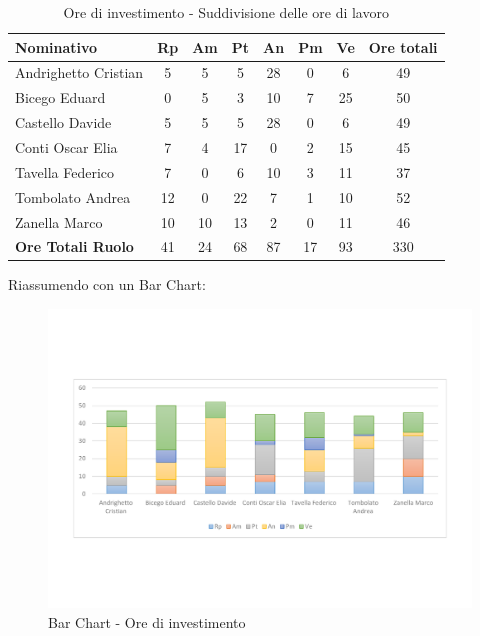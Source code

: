 \documentclass[../PianoProgetto.tex]{subfiles}
\begin{document}
	\begin{table}[h]
		\begin{tabularx}{\textwidth}{l  * {6}{C}  c}
			\toprule
			\textbf{Nominativo} & \textbf{Rp} & \textbf{Am} & \textbf{Pt} 
						& \textbf{An} & \textbf{Pm} & \textbf{Ve} & \textbf{Ore totali} \\
			\midrule
			Andrighetto Cristian & 5 & 5 & 5 & 28 &	0 &	6 &	49 \\
			Bicego Eduard & 0 & 5 & 3 & 10 & 7 & 25 & 50 \\
			Castello Davide & 5 & 5 & 5 & 28 & 0 & 6 & 49 \\
			Conti Oscar Elia & 7 & 4 & 17 & 0 & 2 & 15 & 45 \\
			Tavella Federico &	7 & 0 & 6 & 10 & 3 & 11 & 37 \\
			Tombolato Andrea & 12 & 0 & 22 & 7 & 1 & 10 & 52 \\
			Zanella Marco & 10 & 10 & 13 & 2 & 0 & 11 & 46 \\
			\midrule			
			\textbf{Ore Totali Ruolo} & 41 & 24 & 68 & 87 & 17 & 93 & 330 \\
			\bottomrule
		\end{tabularx}
		\caption{Ore di investimento - Suddivisione delle ore di lavoro}
		\label{tab:investimento_ore}
	\end{table}
\vfill	
	Riassumendo con un Bar Chart:
	
	\begin{figure}[!h]
		\centering
		\includegraphics[width=\textwidth , trim=2cm 5cm 2cm 5cm]{grafici/Riepilogo/Investimento/ore-persona}
			\caption{Bar Chart - Ore di investimento}
		\label{fig:BarChart-investimento_ore}
	\end{figure}
\vfill
\newpage
\vfill	
\end{document}
